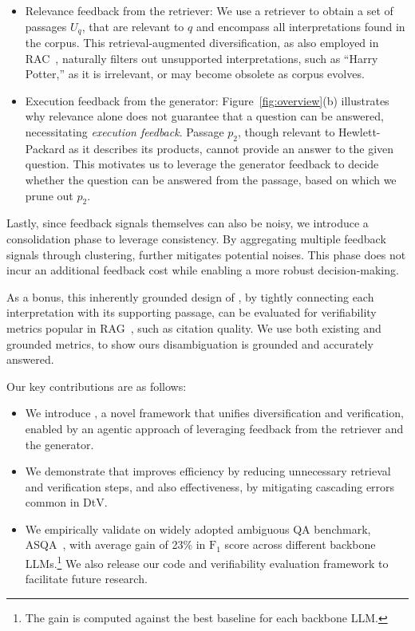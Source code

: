 \begin{itemize}
\item Relevance feedback from the retriever: We use a retriever to obtain a set of passages 
$U_q$, that are relevant to $q$ 
and encompass all interpretations found in the corpus. This retrieval-augmented diversification, as also employed in RAC~\citep{kim-etal-2023-tree}, naturally filters out unsupported interpretations, such as ``Harry Potter,''  as it is irrelevant, or may become obsolete as corpus evolves.


\item Execution feedback from the generator: %
Figure~\ref{fig:overview}(b) illustrates why relevance alone does not guarantee that a question can be answered, necessitating \emph{execution feedback}.
Passage $p_2$, though relevant to Hewlett-Packard as it describes its products, cannot provide an answer to the given question.
This motivates us to leverage the generator feedback to decide whether the question can be answered from the passage, based on which we prune out $p_2$.

\end{itemize}


Lastly, since feedback signals themselves can also be noisy, we introduce a consolidation phase to leverage consistency.
By aggregating  multiple feedback signals through clustering, \ours further mitigates potential noises.
This phase does not incur an additional feedback cost while enabling a more robust decision-making.

As a bonus, this inherently grounded design of \ours,
by tightly connecting each interpretation with its supporting passage, can be evaluated for
verifiability metrics popular in RAG~\citep{li-etal-2023-survey-arxiv,liu-etal-2023-evaluating}, such as citation quality.
We use both existing and grounded metrics, to show ours disambiguation is grounded and accurately answered. 




Our key contributions are as follows:
\begin{itemize}
\item We introduce \ours, a novel framework that unifies diversification and verification, enabled by an
agentic approach of leveraging feedback from the retriever and the generator.
\item We demonstrate that \ours improves efficiency by reducing unnecessary retrieval and verification steps, and also effectiveness, by mitigating cascading errors common in DtV.
\item We empirically validate \ours on widely adopted ambiguous QA benchmark, ASQA~\citep{stelmakh-etal-2022-asqa}, with average gain of 23\% in $\textrm{F}_1$ score across different backbone LLMs.\footnote{The gain is computed against the best baseline for each backbone LLM.}
We also release our code and verifiability evaluation framework to facilitate future research.
\end{itemize}
